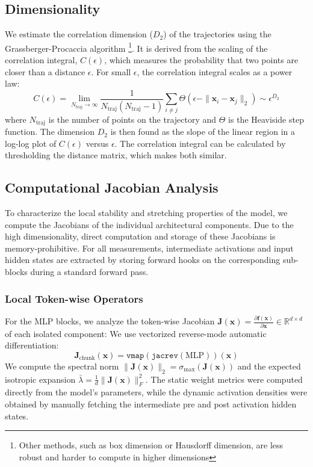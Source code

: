 \documentclass[a4paper,12pt]{article}
\begin{document}
    \subsection{Dimensionality}
    \label{subsec:dimensionality_methods}
    We estimate the correlation dimension ($D_2$) of the trajectories using the Grassberger-Procaccia algorithm \cite{GRASSBERGER1983189} \footnote{Other methods, such as box dimension or Hausdorff dimension, are less robust and harder to compute in higher dimensions}. It is derived from the scaling of the correlation integral, $C(\epsilon)$, which measures the probability that two points are closer than a distance $\epsilon$. For small $\epsilon$, the correlation integral scales as a power law:
    \begin{equation}
        C(\epsilon) = \lim_{N_{\text{traj}} \to \infty} \frac{1}{N_{\text{traj}}(N_{\text{traj}}-1)} \sum_{i \ne j} \Theta(\epsilon - \|\mathbf{x}_i - \mathbf{x}_j\|_2) \sim \epsilon^{D_2}
    \end{equation}
    where $N_{\text{traj}}$ is the number of points on the trajectory and $\Theta$ is the Heaviside step function. The dimension $D_2$ is then found as the slope of the linear region in a log-log plot of $C(\epsilon)$ versus $\epsilon$. The correlation integral can be calculated by thresholding the distance matrix, which makes both similar.

    \subsection{Computational Jacobian Analysis}
    \label{subsec:computational_jacobian}

    To characterize the local stability and stretching properties of the model, we compute the Jacobians of the individual architectural components. Due to the high dimensionality, direct computation and storage of these Jacobians is memory-prohibitive. For all measurements, intermediate activations and input hidden states are extracted by storing forward hooks on the corresponding sub-blocks during a standard forward pass.

    \subsubsection{Local Token-wise Operators}
    For the MLP blocks, we analyze the token-wise Jacobian $\mathbf{J}(\mathbf{x}) = \frac{\partial \mathbf{f}(\mathbf{x})}{\partial \mathbf{x}} \in \mathbb{R}^{d \times d}$ of each isolated component:
    We use vectorized reverse-mode automatic differentiation:
    \begin{equation}
        \mathbf{J}_{\text{chunk}}(\mathbf{x}) = \texttt{vmap}(\texttt{jacrev}(\text{MLP}))(\mathbf{x})
    \end{equation}
    We compute the spectral norm $\|\mathbf{J}(\mathbf{x})\|_2 = \sigma_{\max}(\mathbf{J}(\mathbf{x}))$ and the expected isotropic expansion $\bar{\lambda} = \frac{1}{d} \|\mathbf{J}(\mathbf{x})\|_F^2$. The static weight metrics were computed directly from the model's parameters, while the dynamic activation densities were obtained by manually fetching the intermediate pre and post activation hidden states. 
    
\end{document}
